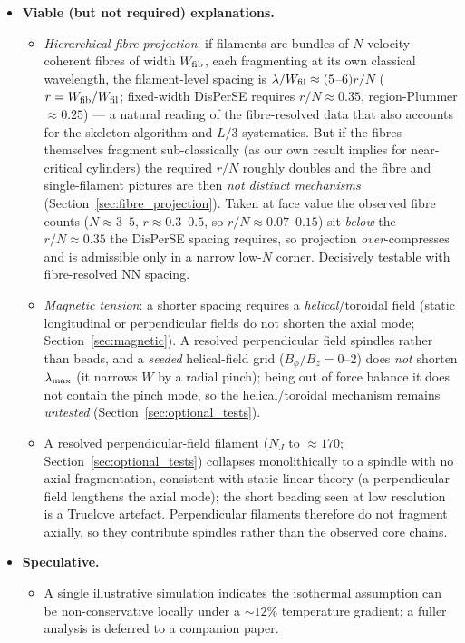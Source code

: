 \documentclass[usenatbib,twoside,twocolumn]{mnras}
\begin{document}
\begin{itemize}
    \item \textbf{Viable (but not required) explanations.}
    \begin{itemize}
        \item \emph{Hierarchical-fibre projection}: if filaments are bundles of $N$ velocity-coherent fibres of width $W_{\rm fib}$, each fragmenting at its own classical wavelength, the filament-level spacing is $\lambda/W_{\rm fil}\approx(5$--$6)r/N$ ($r=W_{\rm fib}/W_{\rm fil}$; fixed-width DisPerSE requires $r/N\approx0.35$, region-Plummer $\approx0.25$) --- a natural reading of the fibre-resolved data \citep{Yang2024,Hacar2013} that also accounts for the skeleton-algorithm and $L/3$ systematics. But if the fibres themselves fragment sub-classically (as our own result implies for near-critical cylinders) the required $r/N$ roughly doubles and the fibre and single-filament pictures are then \emph{not distinct mechanisms} (Section~\ref{sec:fibre_projection}). Taken at face value the observed fibre counts ($N\approx3$--$5$, $r\approx0.3$--$0.5$, so $r/N\approx0.07$--$0.15$) sit \emph{below} the $r/N\approx0.35$ the DisPerSE spacing requires, so projection \emph{over}-compresses and is admissible only in a narrow low-$N$ corner. Decisively testable with fibre-resolved NN spacing.
        \item \emph{Magnetic tension}: a shorter spacing requires a \emph{helical}/toroidal field \citep{Fiege2000} (static longitudinal or perpendicular fields do not shorten the axial mode; Section~\ref{sec:magnetic}). A resolved perpendicular field spindles rather than beads, and a \emph{seeded} helical-field grid ($B_\phi/B_z=0$--$2$) does \emph{not} shorten $\lambda_{\rm max}$ (it narrows $W$ by a radial pinch); being out of force balance it does not contain the \citet{Fiege2000} pinch mode, so the helical/toroidal mechanism remains \emph{untested} (Section~\ref{sec:optional_tests}).
        \item A resolved perpendicular-field filament ($N_J$ to $\approx170$; Section~\ref{sec:optional_tests}) collapses monolithically to a spindle with no axial fragmentation, consistent with static linear theory (a perpendicular field lengthens the axial mode); the short beading seen at low resolution is a Truelove artefact. Perpendicular filaments therefore do not fragment axially, so they contribute spindles rather than the observed core chains.
    \end{itemize}

    \item \textbf{Speculative.}
    \begin{itemize}
        \item A single illustrative simulation indicates the isothermal assumption can be non-conservative locally under a $\sim12\%$ temperature gradient; a fuller analysis is deferred to a companion paper.
    \end{itemize}


\end{itemize}
\end{document}
